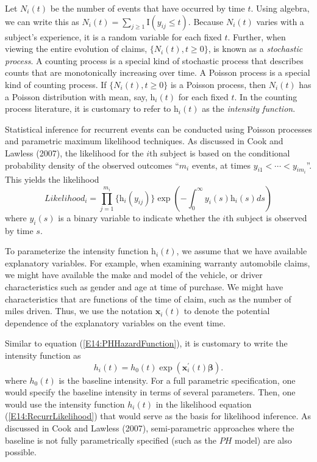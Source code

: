 Let $N_i(t)$ be the number of events that have occurred by time $t$.
Using algebra, we can write this as $N_i(t) = \sum_{j \geq 1}
\mathrm{I}(y_{ij} \leq t).$ Because $N_i(t)$ varies with a subject's
experience, it is a random variable for each fixed $t$. Further,
when viewing the entire evolution of claims, $\{N_i(t), t \geq 0
\}$, is known as a \emph{stochastic process}. A counting process is
a special kind of stochastic process that describes counts that are
monotonically increasing over time. A Poisson process is a special
kind of counting process. If $\{N_i(t), t \geq 0 \}$ is a Poisson
process, then $N_i(t)$ has a Poisson distribution with mean, say,
$\mathrm{h}_i(t)$ for each fixed $t$. In the counting process
literature, it is customary to refer to $\mathrm{h}_i(t)$ as the
\emph{intensity function}.

Statistical inference for recurrent events can be conducted using
Poisson processes and parametric maximum likelihood techniques. As
discussed in Cook and Lawless (2007), the likelihood for the $i$th
subject is based on the conditional probability density of the
observed outcomes ``$m_i$ events, at times $y_{i1} < \cdots <
y_{im_i}$''. This yields the likelihood
\begin{equation}\label{E14:RecurrLikelihood}
Likelihood_i = \prod_{j=1}^{m_i} \{\mathrm{h}_i(y_{ij}) \} \exp
\left(- \int_0^{\infty} y_i(s) \mathrm{h}_i(s) ds \right)
\end{equation}
where $y_i(s)$ is a binary variable to indicate whether the $i$th
subject is observed by time $s$.

To parameterize the intensity function $\mathrm{h}_i(t)$, we assume
that we have available explanatory variables. For example, when
examining warranty automobile claims, we might have available the
make and model of the vehicle, or driver characteristics such as
gender and age at time of purchase. We might have characteristics
that are functions of the time of claim, such as the number of miles
driven. Thus, we use the notation $\mathbf{x}_i(t)$ to denote the
potential dependence of the explanatory variables on the event time.

Similar to equation (\ref{E14:PHHazardFunction}), it is customary to
write the intensity function as
\begin{equation*}
h_i(t) = h_0(t) \exp( \mathbf{x}_i^{\prime}(t) \boldsymbol \beta ).
\end{equation*}
where $h_0(t)$ is the baseline intensity. For a full parametric
specification, one would specify the baseline intensity in terms of
several parameters. Then, one would use the intensity function
$h_i(t)$ in the likelihood equation (\ref{E14:RecurrLikelihood})
that would serve as the basis for likelihood inference. As discussed
in Cook and Lawless (2007), semi-parametric approaches where the
baseline is not fully parametrically specified (such as the $PH$
model) are also possible.


